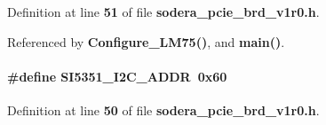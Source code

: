 Definition at line {\bf 51} of file {\bf sodera\+\_\+pcie\+\_\+brd\+\_\+v1r0.\+h}.



Referenced by {\bf Configure\+\_\+\+L\+M75()}, and {\bf main()}.

\paragraph[{S\+I5351\+\_\+\+I2\+C\+\_\+\+A\+D\+DR}]{\setlength{\rightskip}{0pt plus 5cm}\#define S\+I5351\+\_\+\+I2\+C\+\_\+\+A\+D\+DR~0x60}\label{sodera__pcie__brd__v1r0_8h_a189a0420a5d41ae032868730c46f2160}


Definition at line {\bf 50} of file {\bf sodera\+\_\+pcie\+\_\+brd\+\_\+v1r0.\+h}.

